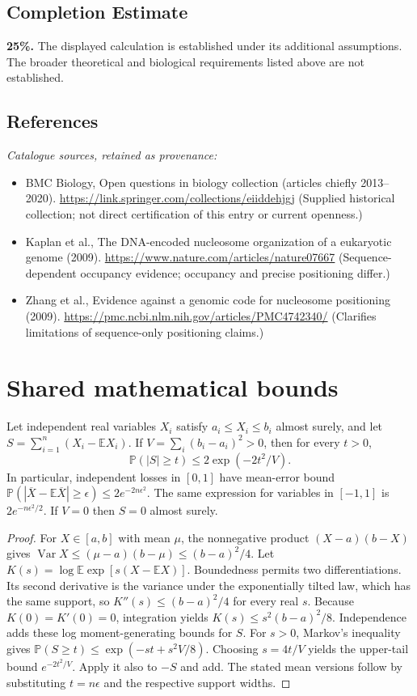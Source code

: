 \documentclass[11pt]{article}
\begin{document}
\subsection{Completion Estimate}
\textbf{25\%.} The displayed calculation is established under its additional assumptions. The broader theoretical and biological requirements listed above are not established.
\subsection{References}
\noindent\emph{Catalogue sources, retained as provenance:}
\begin{itemize}
\item BMC Biology, Open questions in biology collection (articles chiefly 2013--2020). \url{https://link.springer.com/collections/eiiddehjgj} (Supplied historical collection; not direct certification of this entry or current openness.)
\item Kaplan et al., The DNA-encoded nucleosome organization of a eukaryotic genome (2009). \url{https://www.nature.com/articles/nature07667} (Sequence-dependent occupancy evidence; occupancy and precise positioning differ.)
\item Zhang et al., Evidence against a genomic code for nucleosome positioning (2009). \url{https://pmc.ncbi.nlm.nih.gov/articles/PMC4742340/} (Clarifies limitations of sequence-only positioning claims.)
\end{itemize}




\section{Shared mathematical bounds}\label{app:bounds}
\begin{lemma}\label{lem:bounded}
Let independent real variables $X_i$ satisfy $a_i\leq X_i\leq b_i$ almost surely,
and let $S=\sum_{i=1}^n(X_i-\mathbb{E} X_i)$. If
$V=\sum_i(b_i-a_i)^2>0$, then for every $t>0$,
\[
 \mathbb{P}(|S|\geq t)\leq 2\exp(-2t^2/V).
\]
In particular, independent losses in $[0,1]$ have mean-error bound
$\mathbb{P}(|\overline X-\mathbb{E}\overline X|\geq\epsilon)
\leq2e^{-2n\epsilon^2}$. The same expression for variables in $[-1,1]$
is $2e^{-n\epsilon^2/2}$. If $V=0$ then $S=0$ almost surely.
\end{lemma}
\begin{proof}
For $X\in[a,b]$ with mean $\mu$, the nonnegative product
$(X-a)(b-X)$ gives
$\operatorname{Var} X\leq(\mu-a)(b-\mu)\leq(b-a)^2/4$.
Let $K(s)=\log\mathbb{E}\exp[s(X-\mathbb{E} X)]$.
Boundedness permits two differentiations. Its second derivative is the variance
under the exponentially tilted law, which has the same support, so
$K''(s)\leq(b-a)^2/4$ for every real $s$.
Because $K(0)=K'(0)=0$, integration yields
$K(s)\leq s^2(b-a)^2/8$.
Independence adds these log moment-generating bounds for $S$.
For $s>0$, Markov's inequality gives
$\mathbb{P}(S\geq t)\leq\exp(-st+s^2V/8)$.
Choosing $s=4t/V$ yields the upper-tail bound $e^{-2t^2/V}$.
Apply it also to $-S$ and add. The stated mean versions follow by substituting
$t=n\epsilon$ and the respective support widths.
\end{proof}
\end{document}
